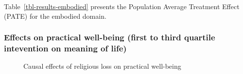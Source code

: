\documentclass[
  singlecolumn,
  9pt]{scrartcl}
\begin{document}
Table~\ref{tbl-results-embodied} presents the Population Average
Treatment Effect (PATE) for the embodied domain.

\subsubsection{Effects on practical well-being (first to third quartile
intevention on meaning of
life)}\label{effects-on-practical-well-being-first-to-third-quartile-intevention-on-meaning-of-life}

\begin{figure}


\caption{\label{fig-results-practical-well-being}Causal effects of
religious loss on practical well-being}

\end{figure}%
\end{document}
